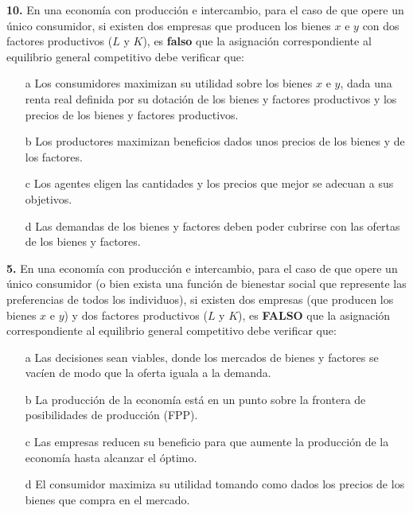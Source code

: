 \documentclass{nuevotema}
\begin{document}
\textbf{10.} En una economía con producción e intercambio, para el caso de que opere un único consumidor, si existen dos empresas que producen los bienes $x$ e $y$ con dos factores productivos ($L$ y $K$), es \textbf{falso} que la asignación correspondiente al equilibrio general competitivo debe verificar que:
\begin{itemize}
	\item[a] Los consumidores maximizan su utilidad sobre los bienes $x$ e $y$, dada una renta real definida por su dotación de los bienes y factores productivos y los precios de los bienes y factores productivos.
	\item[b] Los productores maximizan beneficios dados unos precios de los bienes y de los factores.
	\item[c] Los agentes eligen las cantidades y los precios que mejor se adecuan a sus objetivos.
	\item[d] Las demandas de los bienes y factores deben poder cubrirse con las ofertas de los bienes y factores.
\end{itemize}


\textbf{5.} En una economía con producción e intercambio, para el caso de que opere un único consumidor (o bien exista una función de bienestar social que represente las preferencias de todos los individuos), si existen dos empresas (que producen los bienes $x$ e $y$) y dos factores productivos ($L$ y $K$), es \textbf{FALSO} que la asignación correspondiente al equilibrio general competitivo debe verificar que:
\begin{itemize}
	\item[a] Las decisiones sean viables, donde los mercados de bienes y factores se vacíen de modo que la oferta iguala a la demanda.
	\item[b] La producción de la economía está en un punto sobre la frontera de posibilidades de producción (FPP).
	\item[c] Las empresas reducen su beneficio para que aumente la producción de la economía hasta alcanzar el óptimo.
	\item[d] El consumidor maximiza su utilidad tomando como dados los precios de los bienes que compra en el mercado.
\end{itemize}
\end{document}
